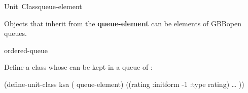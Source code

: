 \documentclass[10pt,twoside,english,pdftex]{article}
\begin{document}

\begin{functiondoc}{Unit~Class}{queue-element}{}
%
%
  
\fnsyntax

\fnpackage {}

\fnmodule {}

\fndescription Objects that inherit from the 
\textbf{queue-element} can be elements of GBBopen queues.

\begin{alsos}{ordered-queue}
\also[on-queue-p]
\also[queue]
\end{alsos}

\fnexample 
{}%
%
Define a  class whose  can be kept in a
queue of :
%
\W\supp
\begin{example}
  (define-unit-class ksa ( queue-element)
    ((rating
      :initform -1
      :type rating)
      \textrm{\ldots{}} ))
\end{example}

\end{functiondoc}

\end{document}
